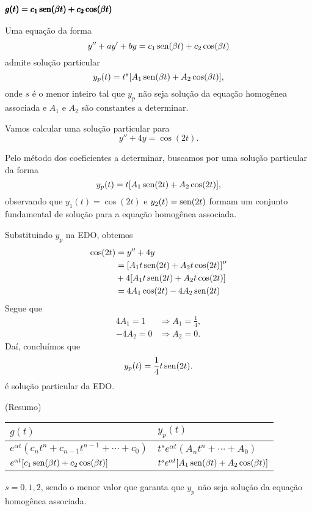 \subsubsection{$\pmb{g(t) = c_1\operatorname{sen}(\beta t) + c_2\cos(\beta t)}$}

Uma equação da forma
\begin{equation}
  y'' + ay' + by = c_1\operatorname{sen}(\beta t) + c_2\cos(\beta t)
\end{equation}
admite solução particular
\begin{equation}
  y_p(t) = t^s[A_1\operatorname{sen}(\beta t) + A_2\cos(\beta t)],
\end{equation}
onde $s$ é o menor inteiro tal que $y_p$ não seja solução da equação homogênea associada e $A_1$ e $A_2$ são constantes a determinar.

\begin{ex}
  Vamos calcular uma solução particular para
  \begin{equation}
    y'' + 4y = \cos(2t).
  \end{equation}

  Pelo método dos coeficientes a determinar, buscamos por uma solução particular da forma
  \begin{equation}
    y_p(t) = t[A_1\operatorname{sen}(2t) + A_2\cos(2t)],
  \end{equation}
  observando que $y_1(t) = \cos(2t)$ e $y_2(t) = \operatorname{sen}(2t)$ formam um conjunto fundamental de solução para a equação homogênea associada.
  
  Substituindo $y_p$ na EDO, obtemos
  \begin{align}
    \cos(2t) &= y'' + 4y \\
             &= [A_1t\operatorname{sen}(2t) + A_2t\cos(2t)]'' \\
             &+ 4[A_1t\operatorname{sen}(2t) + A_2t\cos(2t)] \\
             &= 4A_1\cos(2t) - 4A_2\operatorname{sen}(2t)
  \end{align}
  Segue que
  \begin{align}
    4A_1 = 1 &\Rightarrow A_1 = \frac{1}{4},\\
    -4A_2 = 0 &\Rightarrow A_2 = 0.
  \end{align}
  Daí, concluímos que
  \begin{equation}
    y_p(t) = \frac{1}{4}t\operatorname{sen}(2t).
  \end{equation}
  é solução particular da EDO.
\end{ex}

\begin{obs}(Resumo)\label{obs:edolin_o2_mcd}
  \begin{center}
  \begin{tabular}{ll}
    $g(t)$ & $y_p(t)$ \\\hline
    $e^{\alpha t}(c_nt^n + c_{n-1}t^{n-1} + \cdots + c_0)$ & $t^se^{\alpha t}(A_nt^n + \cdots + A_0)$ \\
    $e^{\alpha t}[c_1\operatorname{sen}(\beta t) + c_2\cos(\beta t)]$ & $t^se^{\alpha t}[A_1\operatorname{sen}(\beta t) + A_2\cos(\beta t)]$ \\\hline
  \end{tabular}
\end{center}
  $s = 0, 1, 2$, sendo o menor valor que garanta que $y_p$ não seja solução da equação homogênea associada.
\end{obs}

